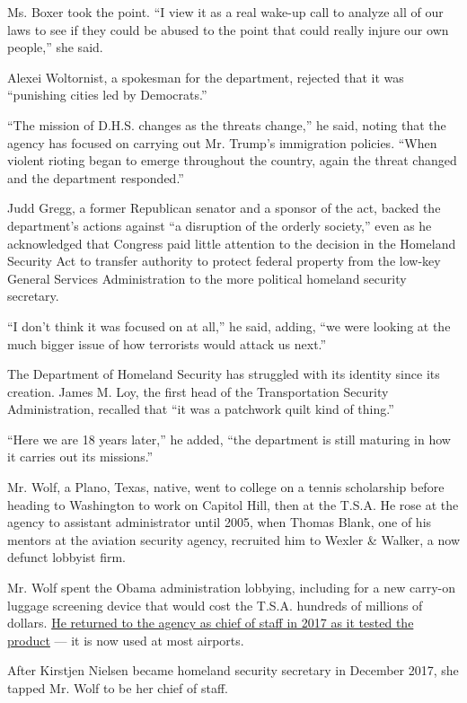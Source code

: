 Ms. Boxer took the point. ``I view it as a real wake-up call to analyze
all of our laws to see if they could be abused to the point that could
really injure our own people,'' she said.

Alexei Woltornist, a spokesman for the department, rejected that it was
``punishing cities led by Democrats.''

``The mission of D.H.S. changes as the threats change,'' he said, noting
that the agency has focused on carrying out Mr. Trump's immigration
policies. ``When violent rioting began to emerge throughout the country,
again the threat changed and the department responded.''

Judd Gregg, a former Republican senator and a sponsor of the act, backed
the department's actions against ``a disruption of the orderly
society,'' even as he acknowledged that Congress paid little attention
to the decision in the Homeland Security Act to transfer authority to
protect federal property from the low-key General Services
Administration to the more political homeland security secretary.

``I don't think it was focused on at all,'' he said, adding, ``we were
looking at the much bigger issue of how terrorists would attack us
next.''

The Department of Homeland Security has struggled with its identity
since its creation. James M. Loy, the first head of the Transportation
Security Administration, recalled that ``it was a patchwork quilt kind
of thing.''

``Here we are 18 years later,'' he added, ``the department is still
maturing in how it carries out its missions.''

Mr. Wolf, a Plano, Texas, native, went to college on a tennis
scholarship before heading to Washington to work on Capitol Hill, then
at the T.S.A. He rose at the agency to assistant administrator until
2005, when Thomas Blank, one of his mentors at the aviation security
agency, recruited him to Wexler \& Walker, a now defunct lobbyist firm.

Mr. Wolf spent the Obama administration lobbying, including for a new
carry-on luggage screening device that would cost the T.S.A. hundreds of
millions of dollars.
\href{https://www.nytimes3xbfgragh.onion/2017/04/15/us/politics/trump-appointees-potential-conflicts.html}{He
returned to the agency as chief of staff in 2017 as it tested the
product} --- it is now used at most airports.

After Kirstjen Nielsen became homeland security secretary in December
2017, she tapped Mr. Wolf to be her chief of staff.

